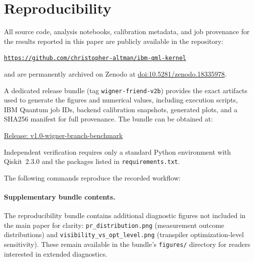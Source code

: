 \documentclass[11pt]{article}
\begin{document}
\section{Reproducibility}
\label{sec:reproducibility}

All source code, analysis notebooks, calibration metadata, and job provenance for the results reported in this paper are publicly available in the repository:
  \vspace*{10pt}%
  
  \hspace*{30pt}%
  \href{https://github.com/christopher-altman/ibm-qml-kernel}{\nolinkurl{https://github.com/christopher-altman/ibm-qml-kernel}}
  \vspace*{10pt}%
  
  and are permanently archived on Zenodo at
\href{https://doi.org/10.5281/zenodo.18335978}{doi:10.5281/zenodo.18335978}.
  \vspace*{10pt}%
  


A dedicated release bundle (tag \texttt{wigner-friend-v2b}) provides the exact artifacts used to generate the figures and numerical values, including execution scripts, IBM Quantum job IDs, backend calibration snapshots, generated plots, and a SHA256 manifest for full provenance. 
The bundle can be obtained at:
  \vspace*{10pt}%

\hspace*{30pt}%
  \href{https://github.com/christopher-altman/ibm-qml-kernel/releases/tag/v1.0-wigner-branch-benchmark}{Release: v1.0-wigner-branch-benchmark}
  \vspace*{10pt}%

Independent verification requires only a standard Python environment with Qiskit~2.3.0 and the packages listed in \texttt{\texttt{requirements.txt}}.



The following commands reproduce the recorded workflow:

\paragraph{Supplementary bundle contents.}
The reproducibility bundle contains additional diagnostic figures not included in the main paper for clarity: \texttt{pr\_distribution.png} (measurement outcome distributions) and \texttt{visibility\_vs\_opt\_level.png} (transpiler optimization-level sensitivity). These remain available in the bundle's \texttt{figures/} directory for readers interested in extended diagnostics.
  \vspace*{2pt}%
\end{document}
